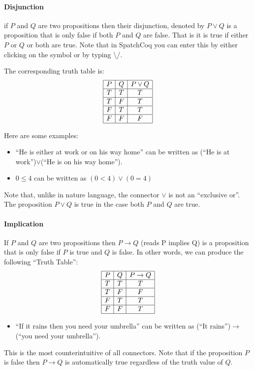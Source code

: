 \paragraph{\bf Disjunction}
 if $P$ and $Q$ are two propositions then their disjunction, denoted by $P\lor Q$ is a proposition that is only false if both $P$ and $Q$ are false. That is it is true if either $P$ or $Q$ or both are true.  Note that in SpatchCoq you can enter this by either clicking on the symbol or by typing \textbackslash /.
 
 The corresponding truth table is: 
 $$\begin{array}{|c|c|c|}\hline P & Q & P\lor Q \\\hline T & T & T \\\hline T & F & T \\\hline F & T & T \\\hline F & F & F\\ \hline\end{array}$$
 
 Here are some examples:

\begin{itemize}
\item ``He is either at work or on his way home'' can be written as (``He is  at work'')$\lor$(``He is on his way home'').
\item $0\le 4$ can be  written as $(0<4)\lor (0=4)$ 
\end{itemize}
Note that, unlike in nature language, the connector $\lor$ is not an ``exclusive or''. The proposition $P\lor Q$ is true in the case both $P$ and $Q$ are true.


\paragraph{\bf Implication} If $P$ and $Q$ are two propositions then  $P\rightarrow Q$  (reads P implies Q) is a proposition that is only false if  $P$ is true and $Q$ is false. In other words, we can produce the following ``Truth Table'':
$$\begin{array}{|c|c|c|}\hline P & Q & P\rightarrow Q \\\hline T & T & T \\\hline T & F & F \\\hline F & T & T \\\hline F & F & T\\ \hline\end{array}$$

\begin{itemize}
\item ``If it rains then you need your umbrella'' can be written as (``It rains'')$\rightarrow$(``you need your umbrella'').

\end{itemize}
This is the most counterintuitive of all connectors. Note that if the proposition $P$ is false then $P\rightarrow Q$ is automatically true regardless of the truth value of $Q$.

